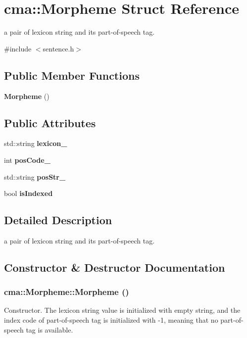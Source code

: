 \section{cma::Morpheme Struct Reference}
\label{structcma_1_1Morpheme}


a pair of lexicon string and its part-\/of-\/speech tag.  


{\ttfamily \#include $<$sentence.h$>$}\subsection*{Public Member Functions}
\begin{DoxyCompactItemize}
\item 
{\bf Morpheme} ()
\end{DoxyCompactItemize}
\subsection*{Public Attributes}
\begin{DoxyCompactItemize}
\item 
std::string {\bf lexicon\_\-}
\item 
int {\bf posCode\_\-}
\item 
std::string {\bf posStr\_\-}
\item 
bool {\bf isIndexed}
\end{DoxyCompactItemize}


\subsection{Detailed Description}
a pair of lexicon string and its part-\/of-\/speech tag. 

\subsection{Constructor \& Destructor Documentation}
\subsubsection[{Morpheme}]{\setlength{\rightskip}{0pt plus 5cm}cma::Morpheme::Morpheme ()}\label{structcma_1_1Morpheme_a79ab5404cd959f89daadb8a7714334cb}
Constructor. The lexicon string value is initialized with empty string, and the index code of part-\/of-\/speech tag is initialized with -\/1, meaning that no part-\/of-\/speech tag is available. 

